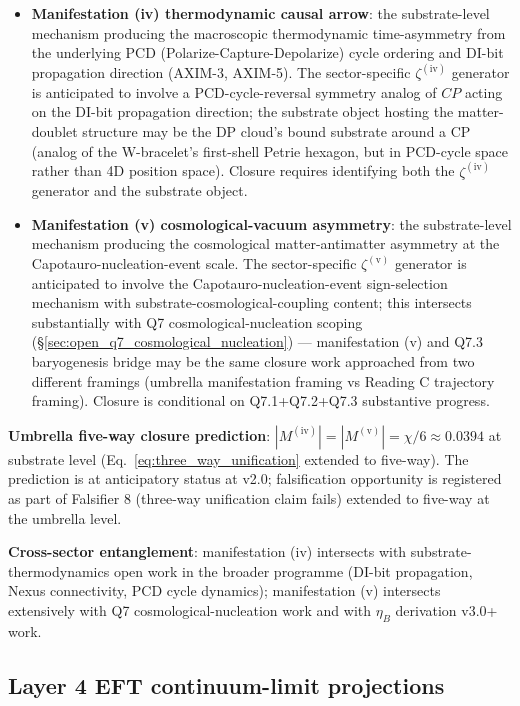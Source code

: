 \documentclass[11pt,letterpaper]{article}
\begin{document}
\begin{itemize}\setlength\itemsep{0.3em}
    \item \textbf{Manifestation (iv) thermodynamic causal arrow}: the substrate-level mechanism producing the macroscopic thermodynamic time-asymmetry from the underlying PCD (Polarize-Capture-Depolarize) cycle ordering and DI-bit propagation direction (AXIM-3, AXIM-5). The sector-specific $\zeta^{(\text{iv})}$ generator is anticipated to involve a PCD-cycle-reversal symmetry analog of $CP$ acting on the DI-bit propagation direction; the substrate object hosting the matter-doublet structure may be the DP cloud's bound substrate around a CP (analog of the W-bracelet's first-shell Petrie hexagon, but in PCD-cycle space rather than 4D position space). Closure requires identifying both the $\zeta^{(\text{iv})}$ generator and the substrate object.
    \item \textbf{Manifestation (v) cosmological-vacuum asymmetry}: the substrate-level mechanism producing the cosmological matter-antimatter asymmetry at the Capotauro-nucleation-event scale. The sector-specific $\zeta^{(\text{v})}$ generator is anticipated to involve the Capotauro-nucleation-event sign-selection mechanism with substrate-cosmological-coupling content; this intersects substantially with Q7 cosmological-nucleation scoping (\S\ref{sec:open_q7_cosmological_nucleation}) --- manifestation (v) and Q7.3 baryogenesis bridge may be the same closure work approached from two different framings (umbrella manifestation framing vs Reading C trajectory framing). Closure is conditional on Q7.1+Q7.2+Q7.3 substantive progress.
\end{itemize}

\textbf{Umbrella five-way closure prediction}: $|M^{(\text{iv})}| = |M^{(\text{v})}| = \chi/6 \approx 0.0394$ at substrate level (Eq.~\eqref{eq:three_way_unification} extended to five-way). The prediction is at anticipatory status at v2.0; falsification opportunity is registered as part of Falsifier 8 (three-way unification claim fails) extended to five-way at the umbrella level.

\textbf{Cross-sector entanglement}: manifestation (iv) intersects with substrate-thermodynamics open work in the broader programme (DI-bit propagation, Nexus connectivity, PCD cycle dynamics); manifestation (v) intersects extensively with Q7 cosmological-nucleation work and with $\eta_B$ derivation v3.0+ work.

\subsection{Layer 4 EFT continuum-limit projections}\label{sec:open_layer4_eft_projections}
\end{document}

